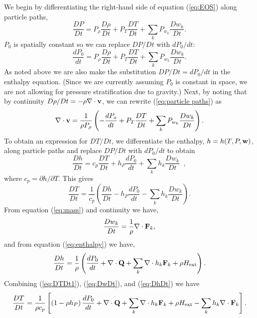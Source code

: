 \documentclass[final]{siamltex}
\def\Fb {{\bf F}}
\def\Qb {{\bf Q}}
\def\vb {{\bf v}}
\def\wb {{\bf w}}
\def\Hext {H_{\rm ext}}
\begin{document}
We begin by differentiating the 
right-hand side of equation (\ref{eq:EOS}) along particle paths,
\begin{equation}
\frac{DP}{Dt} = P_\rho\frac{D\rho}{Dt} + P_T\frac{DT}{Dt} + \sum_kP_{w_k}\frac{Dw_k}{Dt}.
\end{equation}
$P_0$ is spatially constant
so we can replace $DP/Dt$ 
with $d P_0/ dt$:
\begin{equation}
\frac{d P_0}{dt} = P_\rho\frac{D\rho}{Dt} + P_T\frac{DT}{Dt} + \sum_kP_{w_k}\frac{Dw_k}{Dt}.\label{eq:particle paths}
\end{equation}
As noted above we are also make the
substitution $DP/Dt = d P_0/ d t$ in the enthalpy equation.  (Since we
are currently assuming $P_0$ is constant in space, we are not allowing
for pressure stratification due to gravity.)
Next, by noting that by continuity $D\rho/Dt = -\rho\nabla\cdot\vb$, 
we can rewrite 
(\ref{eq:particle paths}) as
\begin{equation}
\nabla\cdot\vb = \frac{1}{\rho P_\rho}\left(-\frac{dP_o}{dt} + P_T\frac{DT}{Dt} + \sum_kP_{w_k}\frac{Dw_k}{Dt}\right).\label{eq:constraint1}
\end{equation}
To obtain an expression for $DT/Dt$, we differentiate the enthalpy, $h=h(T,P,\wb)$, 
along particle paths and replace $DP/Dt$ with $dP_0/dt$ to obtain
\begin{equation}
\frac{Dh}{Dt} = 
c_p \frac{DT}{Dt} 
+ h_P\frac{d P_0}{d t} + \sum_k h_{k}\frac{Dw_k}{Dt}  \;\;  ,
\end{equation}
where $c_p = \partial h/\partial T$.  This gives
\begin{equation}
\frac{DT}{Dt} = \frac{1}{c_p}\left(\frac{Dh}{Dt} - h_P\frac{d P_0}{d t} - \sum_kh_{k}\frac{Dw_k}{Dt}\right).\label{eq:DTDt1}
\end{equation}
From equation (\ref{eq:mass}) and 
continuity we have,
\begin{equation}
\frac{Dw_k}{Dt} = \frac{1}{\rho}\nabla\cdot\Fb_k,\label{eq:DwDt}
\end{equation}
and from equation (\ref{eq:enthalpy}) we have,
\begin{equation}
\frac{Dh}{Dt} = \frac{1}{\rho}\left(\frac{dP_0}{dt} + \nabla\cdot\Qb + \sum_k\nabla\cdot h_k\Fb_k + \rho\Hext\right).\label{eq:DhDt}
\end{equation}
Combining (\ref{eq:DTDt1}), (\ref{eq:DwDt}), and (\ref{eq:DhDt}) we have
\begin{equation}
\frac{DT}{Dt} = \frac{1}{\rho c_p}\left[\left(1 - \rho h_P\right)\frac{dP_0}{dt} + \nabla\cdot\Qb + \sum_k\nabla\cdot h_k\Fb_k + \rho\Hext - \sum_kh_k\nabla\cdot\Fb_k\right].\label{eq:DTDt}
\end{equation}
\end{document}
